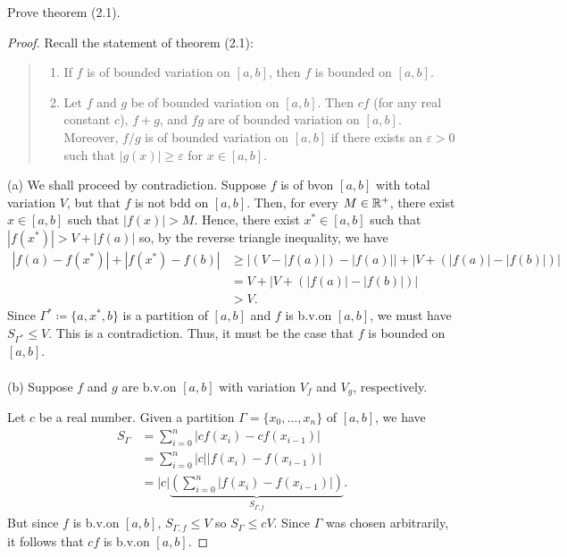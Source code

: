 \begin{problem}
Prove theorem (2.1).
\end{problem}
\begin{proof}
  Recall the statement of theorem (2.1):
  \begin{quote}
    \begin{enumerate}[label=(\alph*),noitemsep]
    \item If $f$ is of bounded variation on $[a,b]$, then $f$ is bounded on
      $[a,b]$.
    \item Let $f$ and $g$ be of bounded variation on $[a,b]$. Then $cf$
      (for any real constant $c$), $f+g$, and $fg$ are of bounded variation
      on $[a,b]$. Moreover, $f/g$ is of bounded variation on $[a,b]$ if
      there exists an $\varepsilon>0$ such that $|g(x)|\geq\varepsilon$ for
      $x\in[a,b]$.
    \end{enumerate}
  \end{quote}
  \noindent%
  (a) We shall proceed by contradiction. Suppose $f$ is of \gls{bv}\@ on
  $[a,b]$ with total variation $V$, but that $f$ is not \gls{bdd} on
  $[a,b]$. Then, for every $M\in\mathbb{R}^+$, there exist $x\in[a,b]$ such that
  $|f(x)|>M$. Hence, there exist $x^*\in[a,b]$ such that
  $|f(x^*)|>V+|f(a)|$ so, by the reverse triangle inequality, we have
  \begin{equation}
    \label{eq:1:3}
    \begin{aligned}
      |f(a)-f(x^*)|+|f(x^*)-f(b)| &\geq
      |(V-|f(a)|)-|f(a)||+|V+(|f(a)|-|f(b)|)|\\
      &=V+|V+(|f(a)|-|f(b)|)|\\
      &>V.
    \end{aligned}
  \end{equation}
  Since $\Gamma^*\coloneqq\{a,x^*,b\}$ is a partition of $[a,b]$ and $f$ is
  b.v.\@ on $[a,b]$, we must have $S_{\Gamma^*}\leq V$. This is a
  contradiction. Thus, it must be the case that $f$ is bounded on
  $[a,b]$. %
  \\\\
  (b) Suppose $f$ and $g$ are b.v.\@ on $[a,b]$ with variation $V_f$ and
  $V_g$, respectively.

  Let $c$ be a real number. Given a partition $\Gamma=\{x_0,\dotsc,x_n\}$
  of $[a,b]$, we have
  \begin{equation}
    \label{eq:eq:1:4}
    \begin{aligned}
      S_\Gamma&=\sum_{i=0}^n|cf(x_i)-cf(x_{i-1})|\\
      &=\sum_{i=0}^n|c||f(x_i)-f(x_{i-1})|\\
      &=|c|\underbrace{\left(\sum_{i=0}^n|f(x_i)-f(x_{i-1})|\right)}_{S_{\Gamma,f}}.
    \end{aligned}
  \end{equation}
  But since $f$ is b.v.\@ on $[a,b]$, $S_{\Gamma,f}\leq V$ so $S_\Gamma\leq
  cV$. Since $\Gamma$ was chosen arbitrarily, it follows that $cf$ is
  b.v.\@ on $[a,b]$.
\end{proof}

